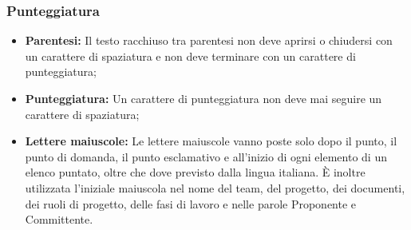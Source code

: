       \subsubsection{Punteggiatura}
        \begin{itemize}
          \item \textbf{Parentesi: }Il testo racchiuso tra parentesi non deve aprirsi o chiudersi con un carattere di spaziatura e non deve terminare con un carattere di punteggiatura;
          \item \textbf{Punteggiatura: }Un carattere di punteggiatura non deve mai seguire un carattere di spaziatura;
          \item \textbf{Lettere maiuscole: }Le lettere maiuscole vanno poste solo dopo il punto, il punto di domanda, il punto esclamativo e all’inizio di ogni elemento di un elenco puntato,
          oltre che dove previsto dalla lingua italiana. È inoltre utilizzata l’iniziale maiuscola nel nome del team, del progetto, dei documenti, dei ruoli di progetto, delle fasi di
          lavoro e nelle parole Proponente e Committente.
        \end{itemize}
